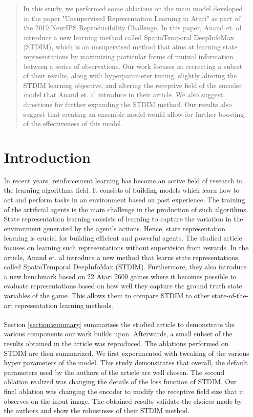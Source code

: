 \begin{abstract}
In this study, we performed some ablations on the main model developed in the paper "Unsupervised Representation Learning in
Atari" \cite{main_article} as part of the 2019 NeurIPS Reproducibility Challenge. In this paper, Anand et. al introduce a new learning method called SpatioTemporal DeepInfoMax (STDIM), which is an unsupervised method that aims at learning state representations by maximizing particular forms of mutual information between a series of observations. Our work focuses on recreating a subset of their results, along with hyperparameter tuning, slightly altering the STDIM learning objective, and altering the receptive field of the encoder model that Anand et. al introduce in their article. We also suggest directions for further expanding the STDIM method. Our results also suggest that creating an ensemble model would allow for further boosting of the effectiveness of this model.

\end{abstract}

\section{Introduction}
In recent years, reinforcement learning has become an active field of research in the learning algorithms field. It consists of building models which learn how to act and perform tasks in an environment based on past experience. The training of the artificial agents is the main challenge in the production of such algorithms. State representation learning consists of learning to capture the variation in the environment generated by the agent's actions. Hence, state representation learning is crucial for building efficient and powerful agents. The studied article focuses on learning such representations without supervision from rewards. In the article, Anand et. al introduce a new method that learns state representations, called SpatioTemporal DeepInfoMax (STDIM). Furthermore, they also introduce a new benchmark based on 22 Atari 2600 games where it becomes possible to evaluate representations based on how well they capture the ground truth state variables of the game. This allows them to compare STDIM to other state-of-the-art representation learning methods.
\\\\
Section \ref{section:summary} summarizes the studied article to demonstrate the various components our work builds upon. Afterwards, a small subset of the results obtained in the article was reproduced. The ablations performed on STDIM are then summarized. We first experimented with tweaking of the various hyper parameters of the model. This study demonstrates that overall, the default parameters used by the authors of the article are well chosen. The second ablation realized was changing the details of the loss function of STDIM. Our final ablation was changing the encoder to modify the receptive field size that it observes on the input image. The obtained results validate the choices made by the authors and show the robustness of their STDIM method.

